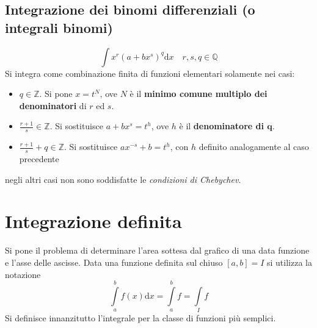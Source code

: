 \documentclass[10pt, oneside]{book}
\theoremstyle{plain}
\begin{document}
\section{Integrazione dei binomi differenziali (o integrali binomi)}
\[\int x^r (a + bx^s)^q \textrm{d}x \quad r, s, q \in \mathbb{Q}\]
Si integra come combinazione finita di funzioni elementari solamente nei casi:
\begin{itemize}
\item $q \in \mathbb{Z}$. Si pone $x = t^N$, ove $N$ è il \textbf{minimo comune multiplo dei denominatori} di $r$ ed $s$.
\item $\displaystyle \frac{r+1}{s} \in \mathbb{Z}$. Si sostituisce $a+bx^s = t^h$, ove $h$ è il \textbf{denominatore di $\mathbf{q}$}.
\item $\displaystyle \frac{r+1}{s} + q \in \mathbb{Z}$. Si sostituisce $ax^{-s} + b = t^h$, con $h$ definito analogamente al caso precedente
\end{itemize}
negli altri casi non sono soddisfatte le \textit{condizioni di Chebychev}.

\chapter{Integrazione definita}
Si pone il problema di determinare l'area sottesa dal grafico di una data funzione e l'asse delle ascisse. Data una funzione definita sul chiuso $[a,b] = I$ si utilizza la notazione
\[\int \limits_a^b f(x) \textrm{d}x = \int \limits_a^b f = \int \limits_I f\]
Si definisce innanzitutto l'integrale per la classe di funzioni più semplici.
\end{document}
